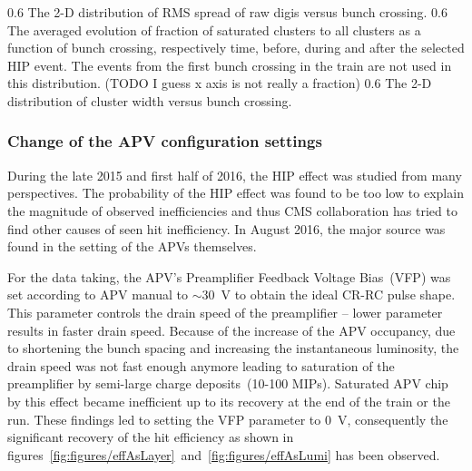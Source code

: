                  {0.6}       %
                 {The 2-D distribution of RMS spread of raw digis versus bunch crossing. } %
                 {0.6}       %
                 {The averaged evolution of fraction of saturated clusters to all clusters as a function of bunch crossing, respectively time, before, during and after the selected HIP event.  The events from the first bunch crossing in the train are not used in this distribution. (TODO I guess x axis is not really a fraction) } %
                 {0.6}       %
                 {The 2-D distribution of cluster width versus bunch crossing. } %


\subsubsection{Change of the APV configuration settings}

During the late 2015 and first half of 2016, the HIP effect was studied from many perspectives. The probability of the HIP effect was found to be too low to explain the magnitude of observed inefficiencies and thus CMS collaboration has tried to find other causes of seen hit inefficiency. In August 2016, the major source was found in the setting of the APVs themselves.

For the data taking, the APV's Preamplifier Feedback Voltage Bias~(VFP) was set according to APV manual to $\sim$30~V to obtain the ideal CR-RC pulse shape. This parameter controls the drain speed of the preamplifier -- lower parameter results in faster drain speed. Because of the increase of the APV occupancy, due to shortening the bunch spacing and increasing the instantaneous luminosity, the drain speed was not fast enough anymore leading to saturation of the preamplifier by semi-large charge deposits~(10-100 MIPs). Saturated APV chip by this effect became inefficient up to its recovery at the end of the train or the run. These findings led to setting the VFP parameter to 0~V, consequently the significant recovery of the hit efficiency as shown in figures~\ref{fig:figures/effAsLayer}~and~\ref{fig:figures/effAsLumi} has been observed.


